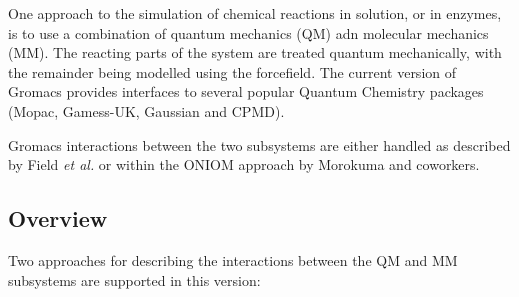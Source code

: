 One approach to the simulation of chemical reactions in solution, or
in enzymes, is to use a combination of quantum mechanics (QM) adn
molecular mechanics (MM). The reacting parts of the system are treated
quantum mechanically, with the remainder being modelled using the
forcefield. The current version of Gromacs provides interfaces to
several popular Quantum Chemistry packages (Mopac\cite{mopac},
Gamess-UK\cite{gamess-uk}, Gaussian\cite{g03} and CPMD\cite{Car85a}).

Gromacs interactions between the two subsystems are
either handled as described by Field {\it{et al.}}\cite{Field90a} or
within the ONIOM approach by Morokuma and coworkers\cite{Maseras96a,
Svensson96a}.

\subsection{Overview}

Two approaches for describing the interactions between the QM and MM
subsystems are supported in this version:

